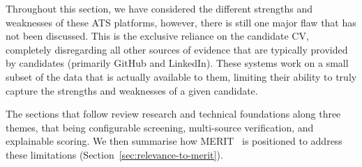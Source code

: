 \vspace{1em}
Throughout this section, we have considered the different strengths and weaknesses of these ATS platforms, however,
there is still one major flaw that has not been discussed. This is the exclusive reliance on the candidate CV, 
completely disregarding all other sources of evidence that are typically provided by candidates (primarily GitHub and LinkedIn).
These systems work on a small subset of the data that is actually available to them, limiting their ability to truly capture
the strengths and weaknesses of a given candidate.

The sections that follow review research and technical foundations along three themes, that being configurable screening, 
multi-source verification, and explainable scoring. We then summarise how MERIT~\cite{merit_repo} is positioned 
to address these limitations (Section~\ref{sec:relevance-to-merit}).